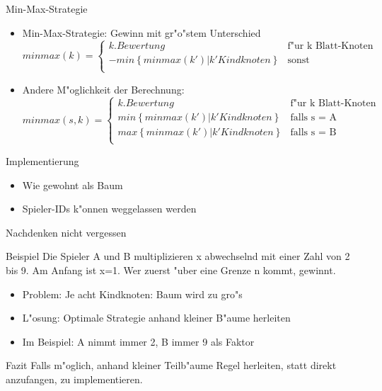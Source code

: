 \documentclass[18pt]{beamer}
\begin{document}
\begin{frame}{Min-Max-Strategie}
\begin{itemize}
\item Min-Max-Strategie: Gewinn mit gr"o"stem Unterschied
\begin{equation}
   minmax(k) =
   \begin{cases}
     k.Bewertung & \text{f"ur k Blatt-Knoten} \\
     - min\left\{minmax(k') | k' Kindknoten\right\} & \text{sonst} \\
   \end{cases}
\end{equation}
\item Andere M"oglichkeit der Berechnung:
\begin{equation}
   minmax(s,k) =
   \begin{cases}
     k.Bewertung & \text{f"ur k Blatt-Knoten} \\
     min\left\{minmax(k') | k' Kindknoten\right\} & \text{falls s = A} \\
     max\left\{minmax(k') | k' Kindknoten\right\} & \text{falls s = B} \\
   \end{cases}
\end{equation}
\end{itemize}
\end{frame}

\begin{frame}{Implementierung}
\begin{itemize}
\item Wie gewohnt als Baum

\item Spieler-IDs k"onnen weggelassen werden

\end{itemize}
\end{frame}

\begin{frame}{Nachdenken nicht vergessen}
\begin{block}{Beispiel}
Die Spieler A und B multiplizieren x abwechselnd mit einer Zahl von 2 bis 9. Am Anfang ist x=1. Wer zuerst "uber eine Grenze n kommt, gewinnt.
\end{block}
\pause
\begin{itemize}
\item Problem: Je acht Kindknoten: Baum wird zu gro"s
\item L"osung: Optimale Strategie anhand kleiner B"aume herleiten
\item Im Beispiel: A nimmt immer 2, B immer 9 als Faktor
\end{itemize}
\pause
\begin{block}{Fazit}
Falls m"oglich, anhand kleiner Teilb"aume Regel herleiten, statt direkt anzufangen, zu implementieren.
\end{block}
\end{frame}
\end{document}
